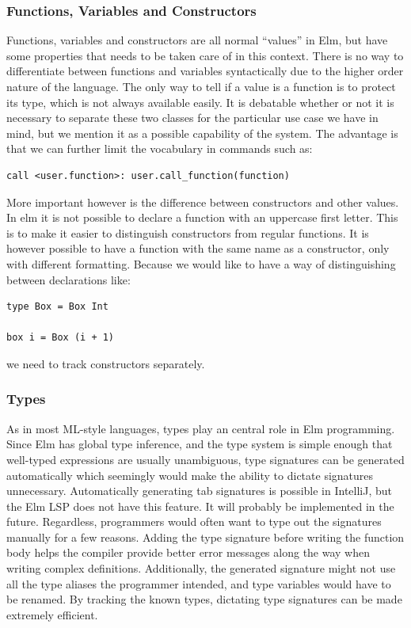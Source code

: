\documentclass[../thesis.tex]{subfiles}
\begin{document}
\subsubsection{Functions, Variables and Constructors}%
\label{par:functions_and_variables}
Functions, variables and constructors are all normal ``values'' in Elm, but have some properties
that needs to be taken care of in this context.
There is no way to differentiate between functions and variables syntactically due to the higher order nature of the language.
The only way to tell if a value is a function is to protect its type, which is not always available easily.
It is debatable whether or not it is necessary to separate these two classes for the particular use case we have in mind,
but we mention it as a possible capability of the system.
The advantage is that we can further limit the vocabulary in commands such as:
\begin{verbatim}
call <user.function>: user.call_function(function)
\end{verbatim}
More important however is the difference between constructors and other values.
In elm it is not possible to declare a function with an uppercase first letter.
This is to make it easier to distinguish constructors from regular functions.
It is however possible to have a function with the same name as a constructor, only with different formatting.
Because we would like to have a way of distinguishing between declarations like:
\begin{verbatim}
type Box = Box Int

box i = Box (i + 1) 
\end{verbatim}
we need to track constructors separately.

\subsubsection{Types}%
\label{par:types}
As in most ML-style languages, types play an central role in Elm programming.
Since Elm has global type inference, and the type system is simple enough that
well-typed expressions are usually unambiguous, type signatures can be generated
automatically which seemingly would make the ability to dictate signatures unnecessary.
Automatically generating tab signatures is possible in IntelliJ, but the Elm LSP does not have this feature. 
It will probably be implemented in the future.
Regardless, programmers would often want to type out the signatures manually for a few reasons.
Adding the type signature before writing the function body helps the compiler provide better
error messages along the way when writing complex definitions.
Additionally, the generated signature might not use all the type aliases the programmer intended, and
type variables would have to be renamed.
By tracking the known types, dictating type signatures can be made extremely efficient.
\end{document}
